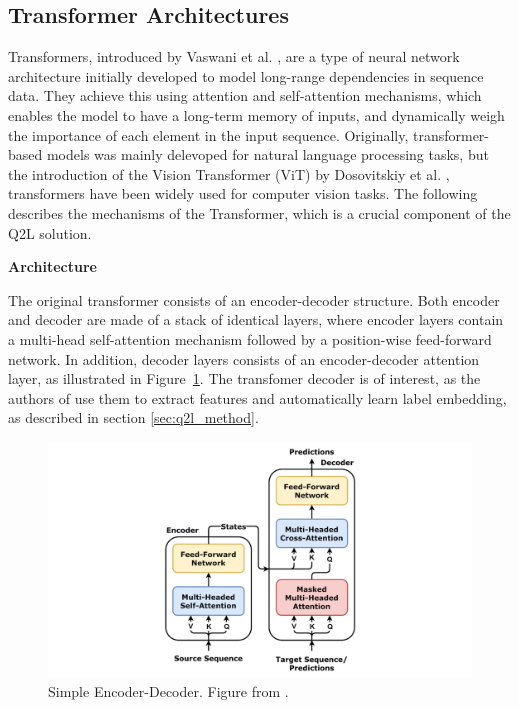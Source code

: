 \documentclass[lettersize,journal]{IEEEtran}
\renewcommand{\paragraph}[1]{%
  \vspace{1.5ex}\textbf{#1}\quad
}
\begin{document}
\subsection{Transformer Architectures}
\label{sec:transformers}
Transformers, introduced by Vaswani et al. \cite{vaswani2023attentionneed}, are a type of neural network architecture initially developed to model long-range dependencies in sequence data. They achieve this using attention and self-attention mechanisms, which enables the model to have a long-term memory of inputs, and dynamically weigh the importance of each element in the input sequence. Originally, transformer-based models was mainly delevoped for natural language processing tasks, but the introduction of the Vision Transformer (ViT) by Dosovitskiy et al. \cite{dosovitskiy2021imageworth16x16words}, transformers have been widely used for computer vision tasks. The following describes the mechanisms of the Transformer, which is a crucial component of the Q2L solution.


\paragraph{Architecture}
The original transformer consists of an encoder-decoder structure. Both encoder and decoder are made of a stack of identical layers, where encoder layers contain a multi-head self-attention mechanism followed by a position-wise feed-forward network. In addition, decoder layers consists of an encoder-decoder attention layer, as illustrated in Figure~\ref{fig:encoder_decoder}. The transfomer decoder is of interest, as the authors of \cite{Query2Label} use them to extract features and automatically learn label embedding, as described in section \ref{sec:q2l_method}.

\begin{figure}[t]
    \centering
    \includegraphics[width=\linewidth]{images/Transformer,_one_encoder-decoder_block.png}
    \caption{Simple Encoder-Decoder. Figure from \cite{godoy_dl_visuals}.}
    \label{fig:encoder_decoder}
\end{figure}
\end{document}

